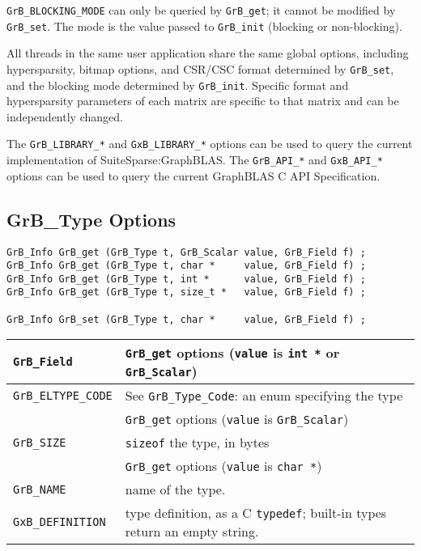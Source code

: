 \verb'GrB_BLOCKING_MODE' can only be queried by \verb'GrB_get'; it cannot be
modified by \verb'GrB_set'.  The mode is the value passed to \verb'GrB_init'
(blocking or non-blocking).

All threads in the same user application share the same global options,
including hypersparsity, bitmap options, and CSR/CSC format determined by
\verb'GrB_set', and the blocking mode determined by \verb'GrB_init'.
Specific format and hypersparsity parameters of each matrix are specific to
that matrix and can be independently changed.

The \verb'GrB_LIBRARY_*' and \verb'GxB_LIBRARY_*' options can be used to query
the current implementation of SuiteSparse:GraphBLAS.  The \verb'GrB_API_*' and
\verb'GxB_API_*' options can be used to query the current GraphBLAS C API
Specification.

\newpage
\subsection{{\sf GrB\_Type} Options}
\label{get_set_type}

\begin{mdframed}[userdefinedwidth=6in]
{\footnotesize
\begin{verbatim}
GrB_Info GrB_get (GrB_Type t, GrB_Scalar value, GrB_Field f) ;
GrB_Info GrB_get (GrB_Type t, char *     value, GrB_Field f) ;
GrB_Info GrB_get (GrB_Type t, int *      value, GrB_Field f) ;
GrB_Info GrB_get (GrB_Type t, size_t *   value, GrB_Field f) ;

GrB_Info GrB_set (GrB_Type t, char *     value, GrB_Field f) ;
\end{verbatim}
}\end{mdframed}

\noindent
{\small
\begin{tabular}{p{2.2in}p{3.5in}}
\hline
\hline
\verb'GrB_Field'                    & \verb'GrB_get' options (\verb'value' is \verb'int *' or \verb'GrB_Scalar') \\
\hline
\verb'GrB_ELTYPE_CODE'              & See \verb'GrB_Type_Code': an enum specifying the type \\
\hline
\hline
                                    & \verb'GrB_get' options (\verb'value' is \verb'GrB_Scalar') \\
\hline
\verb'GrB_SIZE'                     & \verb'sizeof' the type, in bytes \\
\hline
\hline
                                    & \verb'GrB_get' options (\verb'value' is \verb'char *') \\
\hline
\verb'GrB_NAME'                     & name of the type. \\
\verb'GxB_DEFINITION'               & type definition, as a C \verb'typedef'; built-in types return an
                                            empty string. \\
\hline
\end{tabular}
}

